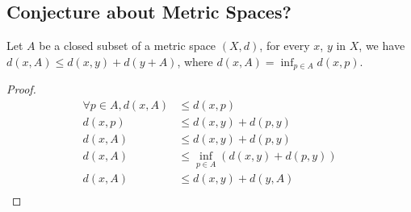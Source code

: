 \documentclass[../../main.tex]{subfiles}
\begin{document}
\subsection{Conjecture about Metric Spaces?}
\begin{wts}
Let $A$ be a closed subset of a metric space $(X,d)$, for every $x$, $y$ in $X$, we have $d(x,A)\leq d(x,y) + d(y+A)$, where $d(x,A) = \inf_{p\in A}d(x,p)$.
\end{wts}
\begin{proof}
\begin{align*}
\forall p\in A, d(x,A)&\leq d(x,p)\\
d(x,p)&\leq d(x,y) + d(p,y)\\
d(x,A)&\leq d(x,y) + d(p,y)\\
d(x,A)&\leq \inf_{p\in A}\left(d(x,y) + d(p,y)\right)\\
d(x,A)&\leq d(x,y) + d(y,A)\\
\end{align*}
\end{proof}
\end{document}
